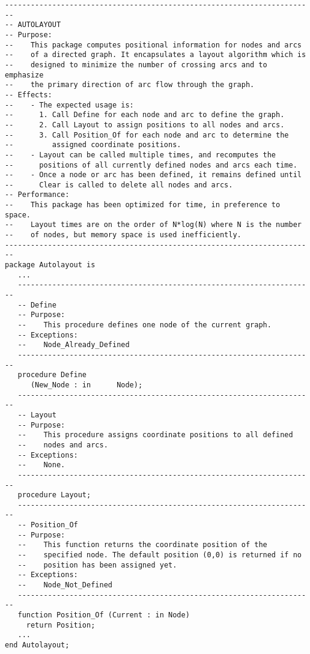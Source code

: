 \begin{lstlisting}
------------------------------------------------------------------------
-- AUTOLAYOUT
-- Purpose:
--    This package computes positional information for nodes and arcs
--    of a directed graph. It encapsulates a layout algorithm which is
--    designed to minimize the number of crossing arcs and to emphasize
--    the primary direction of arc flow through the graph.
-- Effects:
--    - The expected usage is:
--      1. Call Define for each node and arc to define the graph.
--      2. Call Layout to assign positions to all nodes and arcs.
--      3. Call Position_Of for each node and arc to determine the
--         assigned coordinate positions.
--    - Layout can be called multiple times, and recomputes the
--      positions of all currently defined nodes and arcs each time.
--    - Once a node or arc has been defined, it remains defined until
--      Clear is called to delete all nodes and arcs.
-- Performance:
--    This package has been optimized for time, in preference to space.
--    Layout times are on the order of N*log(N) where N is the number
--    of nodes, but memory space is used inefficiently.
------------------------------------------------------------------------
package Autolayout is
   ...
   ---------------------------------------------------------------------
   -- Define
   -- Purpose:
   --    This procedure defines one node of the current graph.
   -- Exceptions:
   --    Node_Already_Defined
   ---------------------------------------------------------------------
   procedure Define
	  (New_Node : in      Node);
   ---------------------------------------------------------------------
   -- Layout
   -- Purpose:
   --    This procedure assigns coordinate positions to all defined
   --    nodes and arcs.
   -- Exceptions:
   --    None.
   ---------------------------------------------------------------------
   procedure Layout;
   ---------------------------------------------------------------------
   -- Position_Of
   -- Purpose:
   --    This function returns the coordinate position of the
   --    specified node. The default position (0,0) is returned if no
   --    position has been assigned yet.
   -- Exceptions:
   --    Node_Not_Defined
   ---------------------------------------------------------------------
   function Position_Of (Current : in Node)
	 return Position;
   ...
end Autolayout;
\end{lstlisting}

